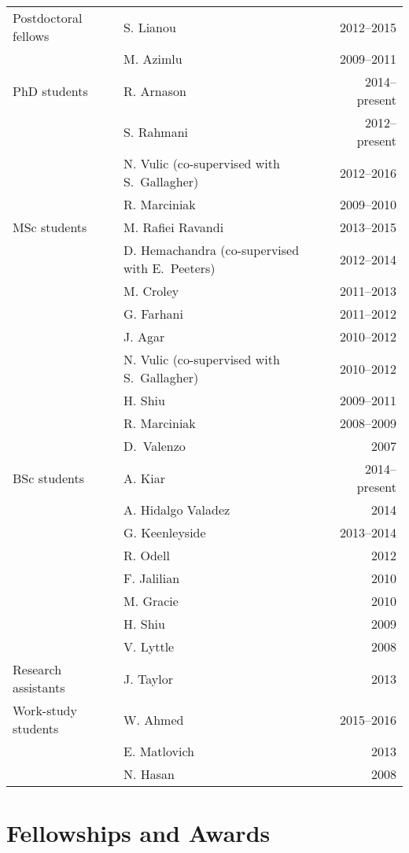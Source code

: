 \documentclass[12pt]{article}
\begin{document}
\begin{tabularx}{\textwidth}{p{5cm}Xr}
Postdoctoral fellows 
& S. Lianou & 2012--2015\\
& M. Azimlu & 2009--2011\\
PhD students 
&  R. Arnason & 2014--present\\
&S. Rahmani& 2012--present \\
&N. Vulic (co-supervised with S.\ Gallagher) & 2012--2016 \\
&R. Marciniak & 2009--2010 \\
MSc students 
& M. Rafiei Ravandi& 2013--2015\\
& D. Hemachandra (co-supervised with E.\ Peeters)& 2012--2014\\
& M. Croley& 2011--2013\\
& G. Farhani& 2011--2012\\
 & J. Agar& 2010--2012\\
& N. Vulic (co-supervised with S.\ Gallagher)& 2010--2012\\
& H. Shiu& 2009--2011\\
& R. Marciniak& 2008--2009\\
& D.\ Valenzo& 2007\\
BSc students
& A. Kiar & 2014--present\\
& A. Hidalgo Valadez & 2014\\
& G. Keenleyside& 2013--2014\\
& R. Odell& 2012\\
& F. Jalilian& 2010\\
& M. Gracie& 2010\\
& H. Shiu& 2009\\
& V. Lyttle& 2008\\
Research assistants 
& J. Taylor& 2013\\
Work-study students
& W. Ahmed & 2015--2016\\
& E. Matlovich& 2013\\
& N. Hasan& 2008\\
\end{tabularx}

\section{Fellowships and Awards}
\end{document}
